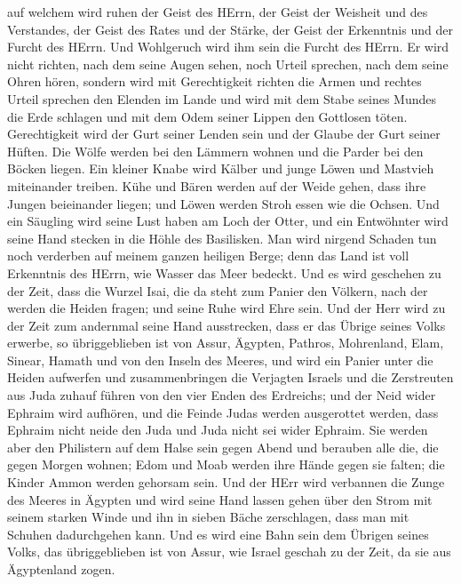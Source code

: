 auf welchem wird ruhen der Geist des HErrn, der Geist der Weisheit und
des Verstandes, der Geist des Rates und der Stärke, der Geist der
Erkenntnis und der Furcht des HErrn.  Und Wohlgeruch wird
ihm sein die Furcht des HErrn. Er wird nicht richten, nach dem seine
Augen sehen, noch Urteil sprechen, nach dem seine Ohren hören,
 sondern wird mit Gerechtigkeit richten die Armen und
rechtes Urteil sprechen den Elenden im Lande und wird mit dem Stabe
seines Mundes die Erde schlagen und mit dem Odem seiner Lippen den
Gottlosen töten.  Gerechtigkeit wird der Gurt seiner Lenden
sein und der Glaube der Gurt seiner Hüften.  Die Wölfe
werden bei den Lämmern wohnen und die Parder bei den Böcken liegen. Ein
kleiner Knabe wird Kälber und junge Löwen und Mastvieh miteinander
treiben.  Kühe und Bären werden auf der Weide gehen, dass
ihre Jungen beieinander liegen; und Löwen werden Stroh essen wie die
Ochsen.  Und ein Säugling wird seine Lust haben am Loch der
Otter, und ein Entwöhnter wird seine Hand stecken in die Höhle des
Basilisken.  Man wird nirgend Schaden tun noch verderben auf
meinem ganzen heiligen Berge; denn das Land ist voll Erkenntnis des
HErrn, wie Wasser das Meer bedeckt.  Und es wird geschehen
zu der Zeit, dass die Wurzel Isai, die da steht zum Panier den Völkern,
nach der werden die Heiden fragen; und seine Ruhe wird Ehre sein.
 Und der Herr wird zu der Zeit zum andernmal seine Hand
ausstrecken, dass er das Übrige seines Volks erwerbe, so übriggeblieben
ist von Assur, Ägypten, Pathros, Mohrenland, Elam, Sinear, Hamath und
von den Inseln des Meeres,  und wird ein Panier unter die
Heiden aufwerfen und zusammenbringen die Verjagten Israels und die
Zerstreuten aus Juda zuhauf führen von den vier Enden des Erdreichs;
 und der Neid wider Ephraim wird aufhören, und die Feinde
Judas werden ausgerottet werden, dass Ephraim nicht neide den Juda und
Juda nicht sei wider Ephraim.  Sie werden aber den
Philistern auf dem Halse sein gegen Abend und berauben alle die, die
gegen Morgen wohnen; Edom und Moab werden ihre Hände gegen sie falten;
die Kinder Ammon werden gehorsam sein.  Und der HErr wird
verbannen die Zunge des Meeres in Ägypten und wird seine Hand lassen
gehen über den Strom mit seinem starken Winde und ihn in sieben Bäche
zerschlagen, dass man mit Schuhen dadurchgehen kann.  Und
es wird eine Bahn sein dem Übrigen seines Volks, das übriggeblieben ist
von Assur, wie Israel geschah zu der Zeit, da sie aus Ägyptenland zogen.
